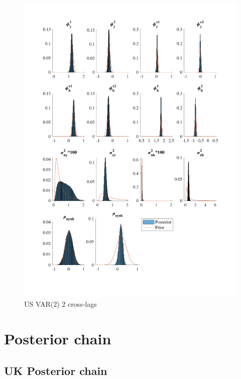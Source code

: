 \documentclass[
  12pt,
]{article}
\begin{document}
\begin{figure}

{\centering \includegraphics[width=0.85\linewidth]{../../Regression/Bayesian_UC_VAR2_drift_Crosscycle2lags/OutputData/posteriorpriordistribution_US} 

}

\caption{US VAR(2) 2 cross-lags}\label{fig:unnamed-chunk-14}
\end{figure}

\clearpage

\hypertarget{posterior-chain}{%
\section{Posterior chain}\label{posterior-chain}}

\hypertarget{uk-posterior-chain}{%
\subsection{UK Posterior chain}\label{uk-posterior-chain}}
\end{document}

